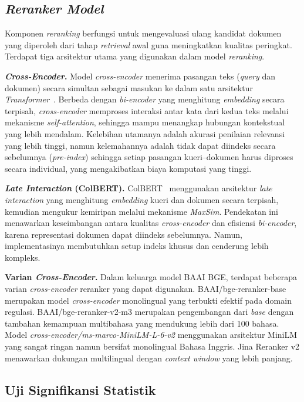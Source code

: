 \subsection{\textit{Reranker Model}}

Komponen \textit{reranking} berfungsi untuk mengevaluasi ulang kandidat dokumen yang diperoleh dari tahap \textit{retrieval} awal guna meningkatkan kualitas peringkat. Terdapat tiga arsitektur utama yang digunakan dalam model \textit{reranking}.

\textbf{\textit{Cross-Encoder}.} Model \textit{cross-encoder} menerima pasangan teks (\textit{query} dan dokumen) secara simultan sebagai masukan ke dalam satu arsitektur \textit{Transformer}~\cite{reimers2019sbert}. Berbeda dengan \textit{bi-encoder} yang menghitung \textit{embedding} secara terpisah, \textit{cross-encoder} memproses interaksi antar kata dari kedua teks melalui mekanisme \textit{self-attention}, sehingga mampu menangkap hubungan kontekstual yang lebih mendalam. Kelebihan utamanya adalah akurasi penilaian relevansi yang lebih tinggi, namun kelemahannya adalah tidak dapat diindeks secara sebelumnya (\textit{pre-index}) sehingga setiap pasangan kueri--dokumen harus diproses secara individual, yang mengakibatkan biaya komputasi yang tinggi.

\textbf{\textit{Late Interaction} (ColBERT).} ColBERT~\cite{khattab2020colbert} menggunakan arsitektur \textit{late interaction} yang menghitung \textit{embedding} kueri dan dokumen secara terpisah, kemudian mengukur kemiripan melalui mekanisme \textit{MaxSim}. Pendekatan ini menawarkan keseimbangan antara kualitas \textit{cross-encoder} dan efisiensi \textit{bi-encoder}, karena representasi dokumen dapat diindeks sebelumnya. Namun, implementasinya membutuhkan setup indeks khusus dan cenderung lebih kompleks.

\textbf{Varian \textit{Cross-Encoder}.} Dalam keluarga model BAAI BGE, terdapat beberapa varian \textit{cross-encoder} reranker yang dapat digunakan. BAAI/bge-reranker-base merupakan model \textit{cross-encoder} monolingual yang terbukti efektif pada domain regulasi. BAAI/bge-reranker-v2-m3 merupakan pengembangan dari \textit{base} dengan tambahan kemampuan multibahasa yang mendukung lebih dari 100 bahasa. Model \textit{cross-encoder/ms-marco-MiniLM-L-6-v2} menggunakan arsitektur MiniLM yang sangat ringan namun bersifat monolingual Bahasa Inggris. Jina Reranker v2 menawarkan dukungan multilingual dengan \textit{context window} yang lebih panjang.

\subsection{Uji Signifikansi Statistik}

